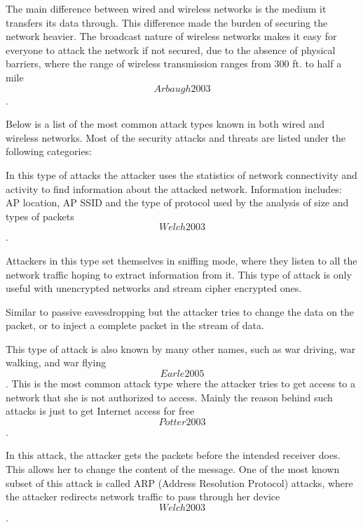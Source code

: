 \documentclass[a4paper,12pt,pagesize,headsepline,bibtotoc,titlepage]{scrartcl}
\begin{document}
The main difference between wired and wireless networks is the medium it transfers its data through. This difference made the burden of securing the network heavier. The broadcast nature of wireless networks makes it easy for everyone to attack the network if not secured, due to the absence of physical barriers, where the range of wireless transmission ranges from 300 ft. to half a mile \[Arbaugh2003\].

Below is a list of the most common attack types known in both wired and wireless networks. Most of the security attacks and threats are listed under the following categories:


In this type of attacks the attacker uses the statistics of network connectivity and activity to find information about the attacked network. Information includes: AP location, AP SSID and the type of protocol used by the analysis of size and types of packets \[Welch2003\].


Attackers in this type set themselves in sniffing mode, where they listen to all the network traffic hoping to extract information from it. This type of attack is only useful with unencrypted networks and stream cipher encrypted ones.


Similar to passive eavesdropping but the attacker tries to change the data on the packet, or to inject a complete packet in the stream of data.


This type of attack is also known by many other names, such as war driving, war walking, and war flying \[Earle2005\]. This is the most common attack type where the attacker tries to get access to a network that she is not authorized to access. Mainly the reason behind such attacks is just to get Internet access for free \[Potter2003\].


In this attack, the attacker gets the packets before the intended receiver does. This allows her to change the content of the message. One of the most known subset of this attack is called ARP (Address Resolution Protocol) attacks, where the attacker redirects network traffic to pass through her device \[Welch2003\].

\end{document}
